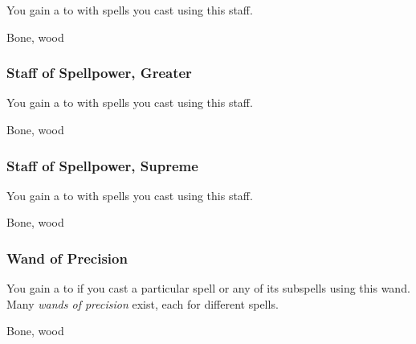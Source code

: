 You gain a   to  with spells you cast using this staff.



 


 Bone, wood


\lowercase{\hypertarget{item:Staff of Spellpower, Greater}{}}\label{item:Staff of Spellpower, Greater}
\hypertarget{item:Staff of Spellpower, Greater}{\subsubsection{Staff of Spellpower, Greater\hfill{}}}

You gain a   to  with spells you cast using this staff.



 


 Bone, wood


\lowercase{\hypertarget{item:Staff of Spellpower, Supreme}{}}\label{item:Staff of Spellpower, Supreme}
\hypertarget{item:Staff of Spellpower, Supreme}{\subsubsection{Staff of Spellpower, Supreme\hfill{}}}

You gain a   to  with spells you cast using this staff.



 


 Bone, wood


\lowercase{\hypertarget{item:Wand of Precision}{}}\label{item:Wand of Precision}
\hypertarget{item:Wand of Precision}{\subsubsection{Wand of Precision\hfill{}}}

You gain a   to  if you cast a particular spell or any of its subspells using this wand.
Many \textit{wands of precision} exist, each for different spells.



 


 Bone, wood


